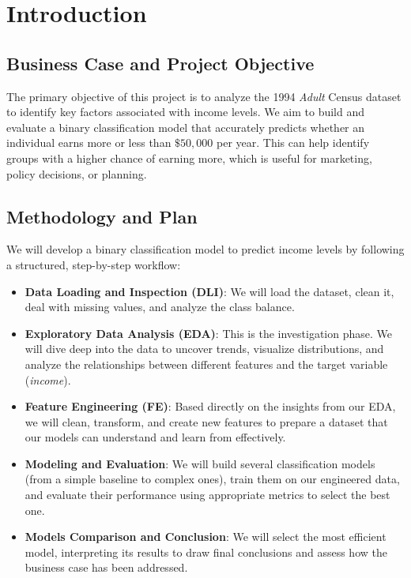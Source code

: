 
\chapter{Introduction}
\label{cp:introduction}

\vspace{2 \baselineskip}
\section{Business Case and Project Objective}
The primary objective of this project is to analyze the 1994 \emph{Adult} Census dataset to identify key factors associated with income levels. We aim to build and evaluate a binary classification model that accurately predicts whether an individual earns more or less than $\$50,000$ per year. This can help identify groups with a higher chance of earning more, which is useful for marketing, policy decisions, or planning. 

\vspace{2 \baselineskip}
\section{Methodology and Plan}
We will develop a binary classification model to predict income levels by following a structured, step-by-step workflow:

\begin{itemize}
    \item \textbf{Data Loading and Inspection (DLI)}: We will load the dataset, clean it, deal with missing values, and analyze the class balance. 
    \item \textbf{Exploratory Data Analysis (EDA)}: This is the investigation phase. We will dive deep into the data to uncover trends, visualize distributions, and analyze the relationships between different features and the target variable (\emph{income}).
    \item \textbf{Feature Engineering (FE)}: Based directly on the insights from our EDA, we will clean, transform, and create new features to prepare a dataset that our models can understand and learn from effectively.
    \item \textbf{Modeling and Evaluation}: We will build several classification models (from a simple baseline to complex ones), train them on our engineered data, and evaluate their performance using appropriate metrics to select the best one.
    \item \textbf{Models Comparison and Conclusion}: We will select the most efficient model, interpreting its results to draw final conclusions and assess how the business case has been addressed.
\end{itemize}

